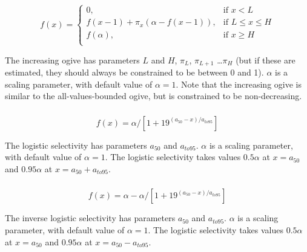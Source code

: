 \subsubsection[Increasing]{}

\begin{equation} 
f(x)=\begin{cases}
	  0, & \text{if $x < L$} \\
	  f(x-1)+ \pi_x(\alpha-f(x-1)), & \text{if $L \le x \le H$} \\
	  f(\alpha), & \text{if $x \ge H$} \\  
  \end{cases}
\end{equation}

The increasing ogive has parameters $L$ and $H$, $\pi_L$, $\pi_{L+1}$ \ldots $\pi_H$ (but if these are estimated, they should always be constrained to be between 0 and 1). $\alpha$ is a scaling parameter, with default value of $\alpha = 1$. Note that the increasing ogive is similar to the all-values-bounded ogive, but is constrained to be non-decreasing.

\subsubsection[Logistic]{}

\begin{equation}
  f(x) = \alpha / [1+19^{(a_{50}-x)/a_{to95}}]
\end{equation}
 
The logistic selectivity has parameters $a_{50}$ and $a_{to95}$. $\alpha$ is a scaling parameter, with default value of $\alpha = 1$. The logistic selectivity takes values $0.5 \alpha$ at $x=a_{50}$ and $0.95 \alpha$ at $x=a_{50}+a_{to95}$. 

\subsubsection[Inverse logistic]{}

\begin{equation}
  f(x) = \alpha - \alpha / [1+19^{(a_{50}-x)/a_{to95}}]
\end{equation}
 
The inverse logistic selectivity has parameters $a_{50}$ and $a_{to95}$. $\alpha$ is a scaling parameter, with default value of $\alpha = 1$. The logistic selectivity takes values $0.5 \alpha$ at $x=a_{50}$ and $0.95 \alpha$ at $x=a_{50}-a_{to95}$. 

